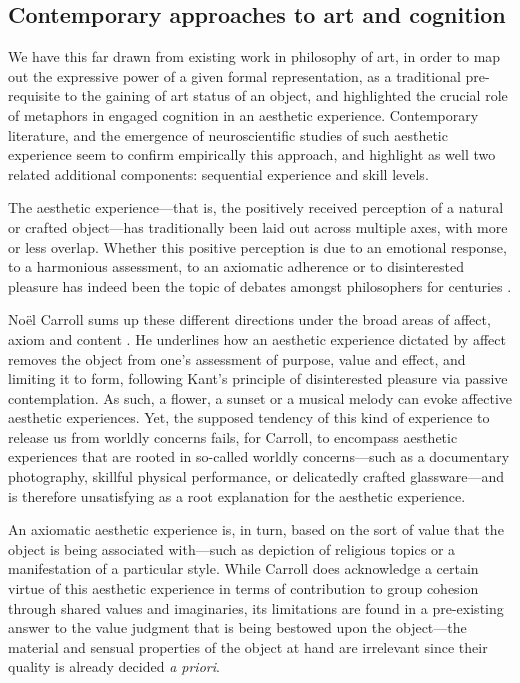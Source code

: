 \subsection{Contemporary approaches to art and cognition}
\label{subsec:art-cognition-contemporary}

We have this far drawn from existing work in philosophy of art, in order to map out the expressive power of a given formal representation, as a traditional pre-requisite to the gaining of art status of an object, and highlighted the crucial role of metaphors in engaged cognition in an aesthetic experience. Contemporary literature, and the emergence of neuroscientific studies of such aesthetic experience seem to confirm empirically this approach, and highlight as well two related additional components: sequential experience and skill levels.

The aesthetic experience—that is, the positively received perception of a natural or crafted object—has traditionally been laid out across multiple axes, with more or less overlap. Whether this positive perception is due to an emotional response, to a harmonious assessment, to an axiomatic adherence or to disinterested pleasure has indeed been the topic of debates amongst philosophers for centuries \citep{peacocke_aesthetic_2023}.

Noël Carroll sums up these different directions under the broad areas of affect, axiom and content \citep{carroll_aesthetic_2002}. He underlines how an aesthetic experience dictated by affect removes the object from one's assessment of purpose, value and effect, and limiting it to form, following Kant's principle of disinterested pleasure via passive contemplation. As such, a flower, a sunset or a musical melody can evoke affective aesthetic experiences. Yet, the supposed tendency of this kind of experience to release us from worldly concerns fails, for Carroll, to encompass aesthetic experiences that are rooted in so-called worldly concerns—such as a documentary photography, skillful physical performance, or delicatedly crafted glassware—and is therefore unsatisfying as a root explanation for the aesthetic experience.

An axiomatic aesthetic experience is, in turn, based on the sort of value that the object is being associated with—such as depiction of religious topics or a manifestation of a particular style. While Carroll does acknowledge a certain virtue of this aesthetic experience in terms of contribution to group cohesion through shared values and imaginaries, its limitations are found in a pre-existing answer to the value judgment that is being bestowed upon the object—the material and sensual properties of the object at hand are irrelevant since their quality is already decided \emph{a priori}.

